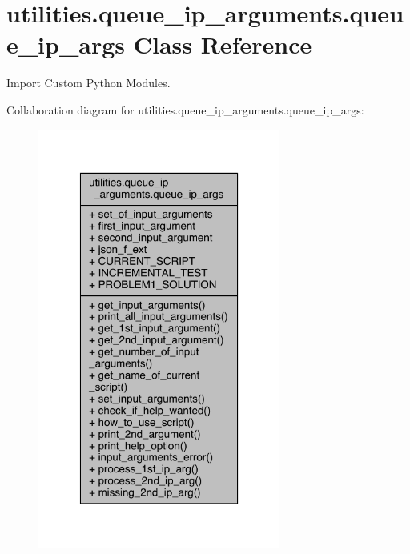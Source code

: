\hypertarget{classutilities_1_1queue__ip__arguments_1_1queue__ip__args}{}\section{utilities.\+queue\+\_\+ip\+\_\+arguments.\+queue\+\_\+ip\+\_\+args Class Reference}
\label{classutilities_1_1queue__ip__arguments_1_1queue__ip__args}


Import Custom Python Modules.  




Collaboration diagram for utilities.\+queue\+\_\+ip\+\_\+arguments.\+queue\+\_\+ip\+\_\+args\+:\nopagebreak
\begin{figure}[H]
\begin{center}
\leavevmode
\includegraphics[width=226pt]{d0/dae/classutilities_1_1queue__ip__arguments_1_1queue__ip__args__coll__graph}
\end{center}
\end{figure}

